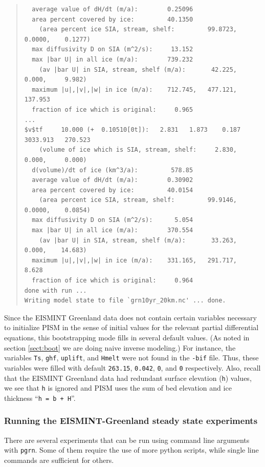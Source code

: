 \documentclass[11pt,final]{amsart}
\begin{document}
\begin{quote}
\begin{verbatim}
  average value of dH/dt (m/a):        0.25096
  area percent covered by ice:         40.1350
    (area percent ice SIA, stream, shelf:         99.8723,    0.0000,    0.1277)
  max diffusivity D on SIA (m^2/s):     13.152
  max |bar U| in all ice (m/a):        739.232
    (av |bar U| in SIA, stream, shelf (m/a):       42.225,     0.000,     9.982)
  maximum |u|,|v|,|w| in ice (m/a):    712.745,   477.121,   137.953
  fraction of ice which is original:     0.965
...
$v$tf     10.000 (+  0.10510[0t]):   2.831   1.873    0.187   3033.913   270.523
    (volume of ice which is SIA, stream, shelf:     2.830,     0.000,     0.000)
  d(volume)/dt of ice (km^3/a):         578.85
  average value of dH/dt (m/a):        0.30902
  area percent covered by ice:         40.0154
    (area percent ice SIA, stream, shelf:         99.9146,    0.0000,    0.0854)
  max diffusivity D on SIA (m^2/s):      5.054
  max |bar U| in all ice (m/a):        370.554
    (av |bar U| in SIA, stream, shelf (m/a):       33.263,     0.000,    14.683)
  maximum |u|,|v|,|w| in ice (m/a):    331.165,   291.717,     8.628
  fraction of ice which is original:     0.964
done with run ... 
Writing model state to file `grn10yr_20km.nc' ... done.
\end{verbatim}
\end{quote}\normalsize

\noindent Since the EISMINT Greenland data does not contain certain variables necessary to initialize PISM in the sense of initial values for the relevant partial differential equations, this bootstrapping mode fills in several default values.  (As noted in section \ref{sect:boot} we are doing naive inverse modeling.)  For instance, the variables \verb|Ts|, \verb|ghf|, \verb|uplift|, and \verb|Hmelt| were not found in the \verb|-bif| file.  Thus, these variables were filled with default \verb|263.15|, \verb|0.042|, \verb|0|, and \verb|0| respectively. Also, recall that the EISMINT Greenland data had redundant surface elevation (\verb|h|) values, we see that \verb|h| is ignored and PISM uses the sum of bed elevation and ice thickness ``\verb|h = b + H|''.

\subsubsection{Running the EISMINT-Greenland steady state experiments}  There are several experiments that can be run using command line arguments with \verb|pgrn|.  Some of them require the use of more python scripts, while single line commands are sufficient for others.
\end{document}
